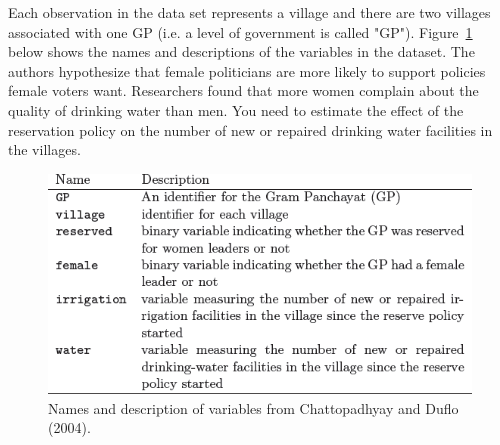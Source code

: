 \documentclass[12pt,letterpaper]{article}
\begin{document}
\noindent Each observation in the data set represents a village and there are two villages associated with one GP (i.e. a level of government is called "GP"). Figure~\ref{fig:women_desc}
below shows the names and descriptions of the variables in the dataset. The authors hypothesize that female politicians are more likely to support policies female voters want. Researchers found that more women complain about the quality of drinking water than men. You need to estimate the effect of the reservation policy on the number of new or repaired drinking water facilities in the villages.
\vspace{.5cm}
\begin{figure}[h!]
	\caption{\footnotesize{Names and description of variables from Chattopadhyay and Duflo (2004).}}
	\vspace{.5cm}
	\centering
	\label{fig:women_desc}
	\includegraphics[width=1.0\textwidth]{graphics/women_desc.png}
\end{figure}		
\end{document}
